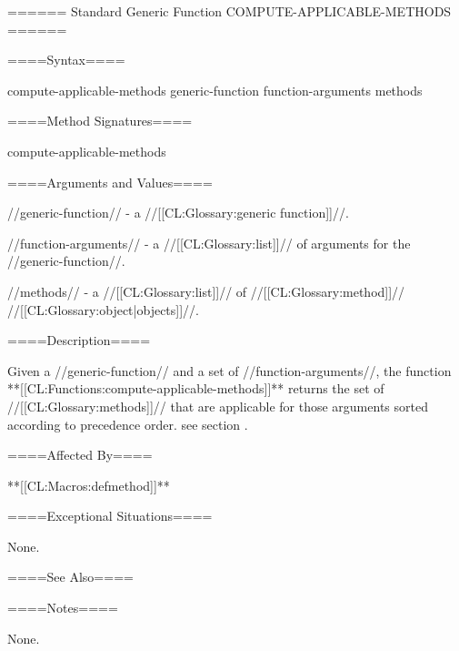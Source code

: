 ====== Standard Generic Function COMPUTE-APPLICABLE-METHODS ======



====Syntax====

\DefgenWithValues compute-applicable-methods {generic-function function-arguments} {methods}

====Method Signatures====

\Defmeth compute-applicable-methods {}



====Arguments and Values====

//generic-function// - a //[[CL:Glossary:generic function]]//.

//function-arguments// - a //[[CL:Glossary:list]]// of arguments for the //generic-function//.

//methods// - a //[[CL:Glossary:list]]// of //[[CL:Glossary:method]]// //[[CL:Glossary:object|objects]]//.

====Description====

Given a //generic-function// and a set of //function-arguments//, the function **[[CL:Functions:compute-applicable-methods]]** returns the set of //[[CL:Glossary:methods]]// that are applicable for those arguments sorted according to precedence order. see section {\secref\MethodSelectionAndCombination}.

====Affected By====

**[[CL:Macros:defmethod]]**

====Exceptional Situations====

None.

====See Also====

{\secref\MethodSelectionAndCombination}

====Notes====

None.


